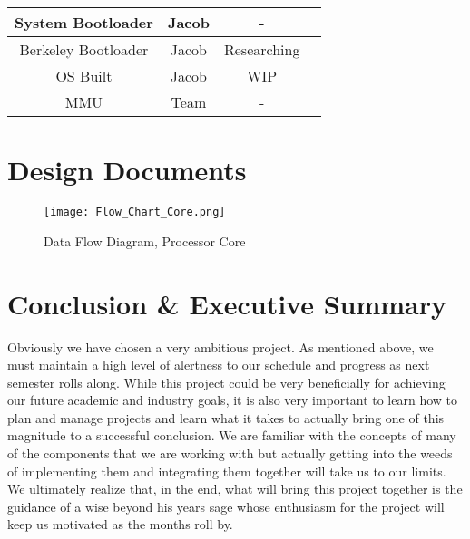 \documentclass{article}
\begin{document}
\begin{table}[ht]
\begin{tabular}{|c|c|c|c|}
System Bootloader   & Jacob                 & -                  &                         \\ \hline
Berkeley Bootloader & Jacob                 & Researching        &                         \\ \hline
OS Built            & Jacob                 & WIP                &                         \\ \hline
MMU                 & Team                  & -                  &                         \\ \hline
\end{tabular}
\end{table}

\section{Design Documents}
\begin{figure}[ht]
\caption{Data Flow Diagram, Processor Core}
\label{flow}
\centering
\texttt{[image: Flow\_Chart\_Core.png]}
\end{figure}

\section{Conclusion \& Executive Summary}
Obviously we have chosen a very ambitious project. As mentioned above, we must maintain a high level of alertness to our schedule and progress as next semester rolls along. While this project could be very beneficially for achieving our future academic and industry goals, it is also very important to learn how to plan and manage projects and learn what it takes to actually bring one of this magnitude to a successful conclusion. We are familiar with the concepts of many of the components that we are working with but actually getting into the weeds of implementing them and integrating them together will take us to our limits. We ultimately realize that, in the end, what will bring this project together is the guidance of a wise beyond his years sage whose enthusiasm for the project will keep us motivated as the months roll by.
\printbibliography
\end{document}
